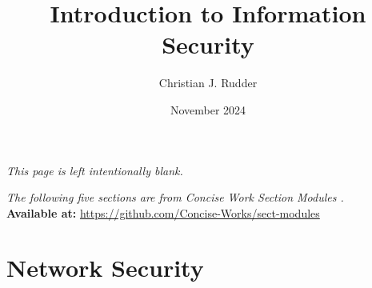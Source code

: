 \documentclass{memoir}
\title{Introduction to Information Security}
\author{Christian J. Rudder}
\date{November 2024}
\begin{document}
\maketitle
\setcounter{tocdepth}{2}

\tableofcontents

\newpage
\thispagestyle{empty}
\mbox{}
\vfill
\begin{center}
    \textit{This page is left intentionally blank.}
\end{center}
\vfill
\newpage
\thispagestyle{empty}
\mbox{}
\vfill
\begin{center}
    \textit{The following five sections are from Concise Work Section Modules \cite{concise_works_modules}.}\\
    \textbf{Available at:} \url{https://github.com/Concise-Works/sect-modules}
\end{center}
\vfill

% 
% 
% 
% 

% 

\chapter{Network Security}



\end{document}

